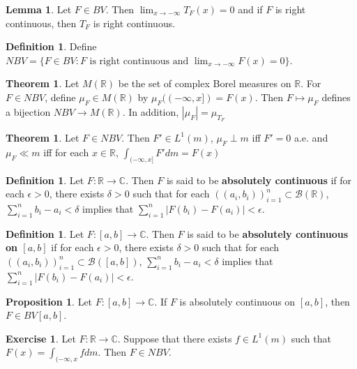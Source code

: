 \documentclass[12pt]{amsart}
\theoremstyle{definition}
\newtheorem{defn}[definition]{Definition}
\newtheorem{thm}[definition]{Theorem}
\newtheorem{lem}[definition]{Lemma}
\newtheorem{prop}[definition]{Proposition}
\newtheorem{ex}[definition]{Exercise}
\newcommand{\del}{\delta}
\newcommand{\ep}{\epsilon}
\newcommand{\C}{\mathbb{C}}
\newcommand{\R}{\mathbb{R}}
\newcommand{\MB}{\mathcal{B}}
\newcommand{\lex}[1]{\label{ex:#1}}
\newcommand{\ld}[1]{\label{defn:#1}}
\begin{document}
	\begin{lem}
		Let $F \in BV$. Then $\lim_{x \rightarrow -\infty}T_F(x)=0$ and if $F$ is right continuous, then $T_F$ is right continuous.
	\end{lem}
	
	\begin{defn} \ld{00000} 
		Define $NBV=\{F \in BV: F \text{ is right continuous and }\lim_{x \rightarrow -\infty}F(x)=0\}$.
	\end{defn}
	
	\begin{thm}
		Let $M(\R)$ be the set of complex Borel measures on $\R$. For $F \in NBV$, define $\mu_F \in M(\R)$ by $\mu_F((-\infty, x]) = F(x)$. Then $F \mapsto \mu_F$ defines a bijection $NBV \rightarrow M(\R)$. In addition, $|\mu_F| = \mu_{T_F}$
	\end{thm}
	
	\begin{thm}
		Let $F \in NBV$. Then $F' \in L^1(m)$, $\mu_F \perp m$ iff $F' =0$ a.e. and $\mu_F \ll m$ iff for each $x \in \R$, $\int_{(-\infty, x]}F'dm = F(x)$
	\end{thm}
	
	\begin{defn} \ld{00000} 
		Let $F: \R \rightarrow \C$. Then $F$ is said to be \textbf{absolutely continuous} if for each $\ep>0$, there exists $\del>0$ such that for each $((a_i, b_i))_{i=1}^n \subset \MB(\R)$, $\sum_{i=1}^n b_i-a_i < \del$ implies that $\sum_{i=1}^n|F(b_i)-F(a_i)| < \ep$.
	\end{defn}
	
	\begin{defn} \ld{00000} 
		Let $F: [a,b] \rightarrow \C$. Then $F$ is said to be \textbf{absolutely continuous on $[a,b]$} if for each $\ep>0$, there exists $\del>0$ such that for each $((a_i, b_i))_{i=1}^n \subset \MB([a,b])$, $\sum_{i=1}^n b_i-a_i < \del$ implies that $\sum_{i=1}^n|F(b_i)-F(a_i)| < \ep$.
	\end{defn}
	
	\begin{prop}
		Let $F:[a,b] \rightarrow \C$. If $F$ is absolutely continuous on $[a,b]$, then $F \in BV[a,b]$.
	\end{prop}
	
	\begin{ex} \lex{00000} 
		Let $F: \R \rightarrow \C$. Suppose that there exists $f \in L^1(m)$ such that $F(x) = \int_{(-\infty, x}fdm$. Then $F \in NBV$.
	\end{ex}
	
\end{document}

